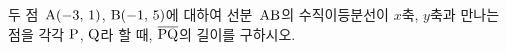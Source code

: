 두 점~$\mathrm{A}(-3,\,1)$, $\mathrm{B}(-1,\,5)$에 대하여 선분~$\mathrm{AB}$의 수직이등분선이 $x$축, $y$축과 만나는 점을 각각 $\mathrm{P}$, $\mathrm{Q}$라 할 때, $\overline{\mathrm{PQ}}$의 길이를 구하시오.
